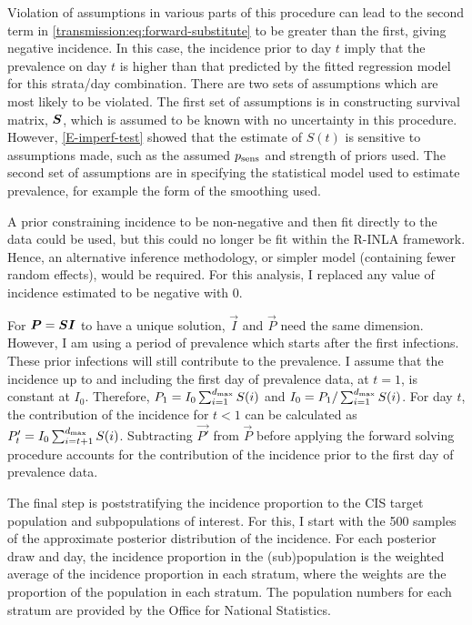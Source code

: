 \documentclass[thesis.tex]{subfiles}
\begin{document}
Violation of assumptions in various parts of this procedure can lead to the second term in \cref{transmission:eq:forward-substitute} to be greater than the first, giving negative incidence.
In this case, the incidence prior to day $t$ imply that the prevalence on day $t$ is higher than that predicted by the fitted regression model for this strata/day combination.
There are two sets of assumptions which are most likely to be violated.
The first set of assumptions is in constructing survival matrix, $\bm{S}$, which is assumed to be known with no uncertainty in this procedure.
However, \cref{E-imperf-test} showed that the estimate of $S(t)$ is sensitive to assumptions made, such as the assumed $p_\text{sens}$ and strength of priors used.
The second set of assumptions are in specifying the statistical model used to estimate prevalence, for example the form of the smoothing used.

A prior constraining incidence to be non-negative and then fit directly to the data could be used, but this could no longer be fit within the R-INLA framework.
Hence, an alternative inference methodology, or simpler model (\eg containing fewer random effects), would be required.
For this analysis, I replaced any value of incidence estimated to be negative with 0.

For $\bm{P} = \bm{S} \bm{I}$ to have a unique solution, $\vec{I}$ and $\vec{P}$ need the same dimension.
However, I am using a period of prevalence which starts after the first infections.
These prior infections will still contribute to the prevalence.
I assume that the incidence up to and including the first day of prevalence data, at $t = 1$, is constant at $I_0$.
Therefore, $P_1 = I_0 \sum_{i=1}^{d_\text{max}} S(i)$ and $I_0 = P_1 / \sum_{i=1}^{d_\text{max}} S(i)$.
For day $t$, the contribution of the incidence for $t < 1$ can be calculated as $P'_t = I_0 \sum_{i=t+1}^{d_\text{max}} S(i)$.
Subtracting $\vec{P'}$ from $\vec{P}$ before applying the forward solving procedure accounts for the contribution of the incidence prior to the first day of prevalence data.

The final step is poststratifying the incidence proportion to the CIS target population and subpopulations of interest.
For this, I start with the 500 samples of the approximate posterior distribution of the incidence.
For each posterior draw and day, the incidence proportion in the (sub)population is the weighted average of the incidence proportion in each stratum, where the weights are the proportion of the population in each stratum.
The population numbers for each stratum are provided by the Office for National Statistics.
\end{document}
